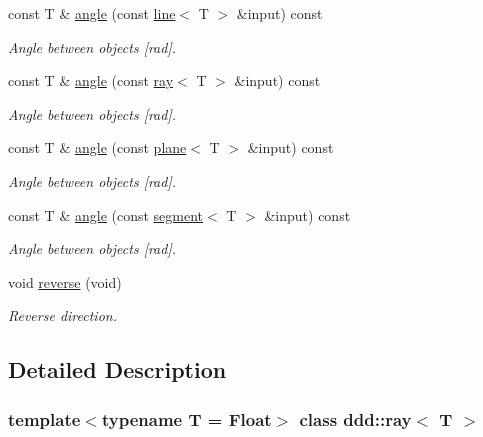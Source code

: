 \begin{DoxyCompactItemize}
const T \& \hyperlink{classddd_1_1ray_a148b37b45554dbdffd57c5574ad3836f}{angle} (const \hyperlink{classddd_1_1line}{line}$<$ T $>$ \&input) const
\begin{DoxyCompactList}\small\item\em Angle between objects \mbox{[}rad\mbox{]}. \end{DoxyCompactList}\item 
const T \& \hyperlink{classddd_1_1ray_a2d95fa78240a0e66d36cff629e5a8e0b}{angle} (const \hyperlink{classddd_1_1ray}{ray}$<$ T $>$ \&input) const
\begin{DoxyCompactList}\small\item\em Angle between objects \mbox{[}rad\mbox{]}. \end{DoxyCompactList}\item 
const T \& \hyperlink{classddd_1_1ray_ac7fa512fde0e202a0f64463b12ea7e11}{angle} (const \hyperlink{classddd_1_1plane}{plane}$<$ T $>$ \&input) const
\begin{DoxyCompactList}\small\item\em Angle between objects \mbox{[}rad\mbox{]}. \end{DoxyCompactList}\item 
const T \& \hyperlink{classddd_1_1ray_ab634fe1fa02504d0b5de85555be324d5}{angle} (const \hyperlink{classddd_1_1segment}{segment}$<$ T $>$ \&input) const
\begin{DoxyCompactList}\small\item\em Angle between objects \mbox{[}rad\mbox{]}. \end{DoxyCompactList}\item 
\mbox{\label{classddd_1_1ray_a1a55daac434b754f4fb951a8dba6b4c9}} 
void \hyperlink{classddd_1_1ray_a1a55daac434b754f4fb951a8dba6b4c9}{reverse} (void)
\begin{DoxyCompactList}\small\item\em Reverse direction. \end{DoxyCompactList}\end{DoxyCompactItemize}


\subsection{Detailed Description}
\subsubsection*{template$<$typename T = Float$>$\newline
class ddd\+::ray$<$ T $>$}

